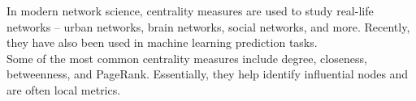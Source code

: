 \documentclass[preview]{standalone}
\begin{document}
In modern network science, centrality measures are used to study real-life networks -- urban networks, brain networks, social networks, and more. Recently, they have also been used in machine learning prediction tasks.\\Some of the most common centrality measures include degree, closeness, betweenness, and PageRank. Essentially, they help identify influential nodes and are often local metrics.\\
\end{document}
